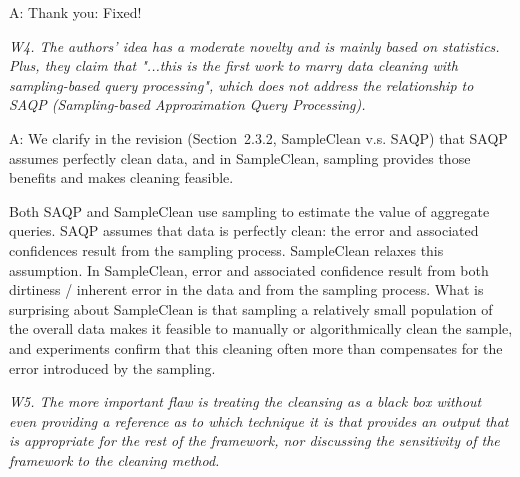 A: Thank you: Fixed!

\mbox{}

\emph{W4. The authors' idea has a moderate novelty and is mainly based on statistics. Plus, they claim that "...this is the first work to marry data cleaning with sampling-based query processing", which does not address the relationship to SAQP (Sampling-based Approximation Query Processing).}


A:    We clarify in the revision (Section~2.3.2, SampleClean v.s. SAQP) that SAQP assumes perfectly clean data, and in SampleClean, sampling provides those benefits 
  and makes cleaning feasible.

Both SAQP
and SampleClean use sampling to estimate the value of aggregate
queries.  SAQP assumes that data is perfectly clean: the error and
associated confidences result from the sampling process.  SampleClean
relaxes this assumption.  In SampleClean, error and associated
confidence result from both dirtiness / inherent error in the data and
from the sampling process.  What is surprising about SampleClean is
that sampling a relatively small population of the overall data makes
it feasible to manually or algorithmically clean the sample, and
experiments confirm that this cleaning often more than compensates for
the error introduced by the sampling.  %


\vspace{.5em}



\mbox{}

\emph{W5. The more important flaw is treating the cleansing as a black box without even providing a reference as to which technique it is that provides an output that is appropriate for the rest of the framework, nor discussing the sensitivity of the framework to the cleaning method.}



